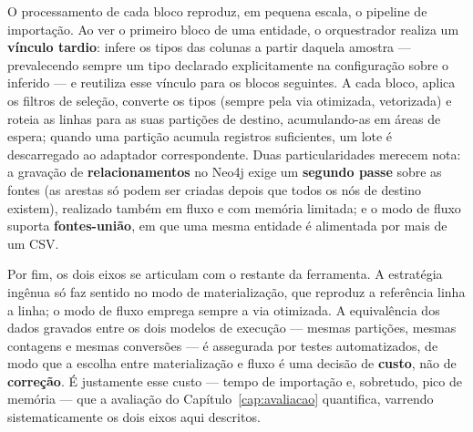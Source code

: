 O processamento de cada bloco reproduz, em pequena escala, o pipeline de importação. Ao ver
o primeiro bloco de uma entidade, o orquestrador realiza um \textbf{vínculo tardio}: infere
os tipos das colunas a partir daquela amostra --- prevalecendo sempre um tipo declarado
explicitamente na configuração sobre o inferido --- e reutiliza esse vínculo para os blocos
seguintes. A cada bloco, aplica os filtros de seleção, converte os tipos (sempre pela via
otimizada, vetorizada) e roteia as linhas para as suas partições de destino, acumulando-as
em áreas de espera; quando uma partição acumula registros suficientes, um lote é descarregado
ao adaptador correspondente. Duas particularidades merecem nota: a gravação de
\textbf{relacionamentos} no Neo4j exige um \textbf{segundo passe} sobre as fontes (as arestas
só podem ser criadas depois que todos os nós de destino existem), realizado também em fluxo e
com memória limitada; e o modo de fluxo suporta \textbf{fontes-união}, em que uma mesma
entidade é alimentada por mais de um CSV.

Por fim, os dois eixos se articulam com o restante da ferramenta. A estratégia ingênua só
faz sentido no modo de materialização, que reproduz a referência linha a linha; o modo de
fluxo emprega sempre a via otimizada. A equivalência dos dados gravados entre os dois
modelos de execução --- mesmas partições, mesmas contagens e mesmas conversões --- é
assegurada por testes automatizados, de modo que a escolha entre materialização e fluxo é
uma decisão de \textbf{custo}, não de \textbf{correção}. É justamente esse custo --- tempo de
importação e, sobretudo, pico de memória --- que a avaliação do Capítulo~\ref{cap:avaliacao}
quantifica, varrendo sistematicamente os dois eixos aqui descritos.
